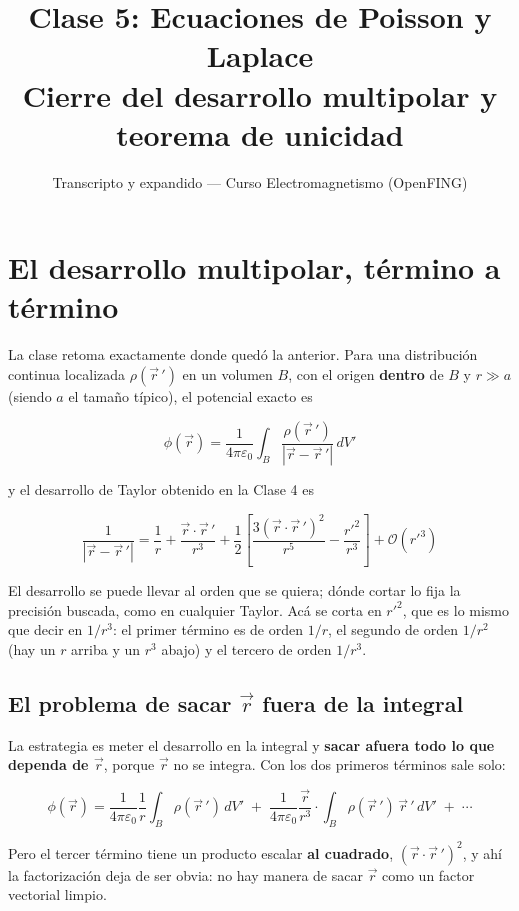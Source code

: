 \documentclass[12pt,a4paper]{article}
\title{\textbf{Clase 5: Ecuaciones de Poisson y Laplace} \\[0.3em]
        \large{Cierre del desarrollo multipolar y teorema de unicidad}}
\author{Transcripto y expandido --- Curso Electromagnetismo (OpenFING)}
\date{}
\begin{document}
\maketitle
\thispagestyle{empty}
\newpage

\tableofcontents
\newpage


\section{El desarrollo multipolar, término a término}

La clase retoma exactamente donde quedó la anterior. Para una distribución
continua localizada $\rho(\vec r\,')$ en un volumen $B$, con el origen
\textbf{dentro} de $B$ y $r \gg a$ (siendo $a$ el tamaño típico), el potencial
exacto es

\[
\phi(\vec r) = \frac{1}{4\pi\varepsilon_0}\int_B \frac{\rho(\vec r\,')}{|\vec r - \vec r\,'|}\,dV'
\]

y el desarrollo de Taylor obtenido en la Clase 4 es

\[
\frac{1}{|\vec r - \vec r\,'|} = \frac{1}{r} + \frac{\vec r\cdot\vec r\,'}{r^{3}}
+ \frac{1}{2}\left[\frac{3(\vec r\cdot\vec r\,')^{2}}{r^{5}} - \frac{r'^{2}}{r^{3}}\right]
+ \mathcal{O}(r'^{3})
\]

\begin{notebox}
El desarrollo se puede llevar al orden que se quiera; dónde cortar lo fija la
precisión buscada, como en cualquier Taylor. Acá se corta en $r'^2$, que es lo
mismo que decir en $1/r^3$: el primer término es de orden $1/r$, el segundo de
orden $1/r^2$ (hay un $r$ arriba y un $r^3$ abajo) y el tercero de orden $1/r^3$.
\end{notebox}

\subsection{El problema de sacar $\vec r$ fuera de la integral}

La estrategia es meter el desarrollo en la integral y \textbf{sacar afuera todo
lo que dependa de $\vec r$}, porque $\vec r$ no se integra. Con los dos primeros
términos sale solo:

\[
\phi(\vec r) = \frac{1}{4\pi\varepsilon_0}\frac{1}{r}\int_B \rho(\vec r\,')\,dV'
\;+\; \frac{1}{4\pi\varepsilon_0}\frac{\vec r}{r^{3}}\cdot\int_B \rho(\vec r\,')\,\vec r\,'\,dV'
\;+\;\cdots
\]

Pero el tercer término tiene un producto escalar \textbf{al cuadrado},
$(\vec r\cdot\vec r\,')^2$, y ahí la factorización deja de ser obvia: no hay
manera de sacar $\vec r$ como un factor vectorial limpio.
\end{document}
